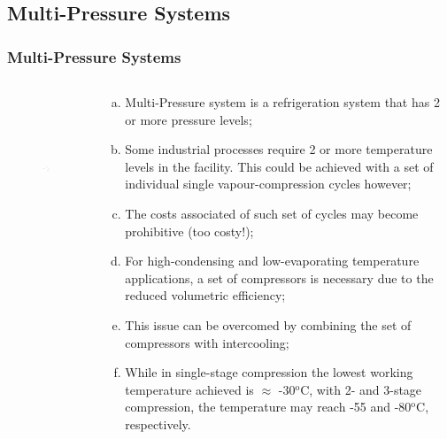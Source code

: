 \documentclass[10pt,compress,handout,ignorenonframetext]{beamer}
\begin{document}
\subsection{Multi-Pressure Systems}


\begin{frame}
 \frametitle{Multi-Pressure Systems}
 \begin{columns}
  \begin{column}[c]{0.33\linewidth}
   \begin{figure}%
      \includegraphics[width=4.5cm,height=4.5cm,clip]{./Pics/Overview_Refrig28}
   \end{figure}  
  \end{column}  
  \begin{column}[c]{0.67\linewidth}
   \begin{enumerate}[(a)]
    \item <1-> Multi-Pressure system is a refrigeration system that has 2 or more pressure levels;
    \item <2-> Some industrial processes require 2 or more temperature levels in the facility. This could be achieved with a set of individual single vapour-compression cycles however;
    \item <3-> The costs associated of such set of cycles may become prohibitive (too costy!);
    \item <4-> For high-condensing and low-evaporating temperature applications, a set of compressors is necessary due to the reduced volumetric efficiency;
    \item <5-> This issue can be overcomed by combining the set of compressors with intercooling;
    \item <6-> While in single-stage compression the lowest working temperature achieved is $\approx$ -30$^{\text{o}}$C, with 2- and 3-stage compression, the temperature may reach -55 and -80$^{\text{o}}$C, respectively.
   \end{enumerate} 
  \end{column}  
 \end{columns} 
\end{frame}
\end{document}
